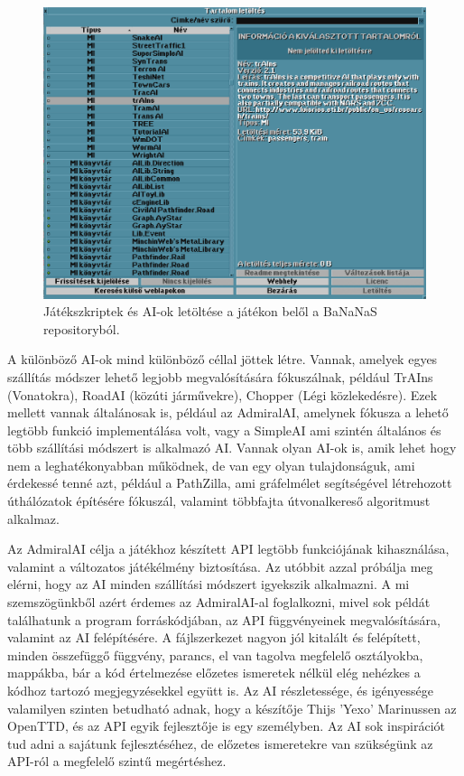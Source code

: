 \begin{figure}
	\centering
	\includegraphics[width=\textwidth]{images/bananas.png}
	\caption{Játékszkriptek és AI-ok letöltése a játékon belől a BaNaNaS repositoryból.}
	\label{fig:bananas}
\end{figure}

A különböző AI-ok mind különböző céllal jöttek létre. Vannak, amelyek egyes szállítás módszer lehető legjobb megvalósítására fókuszálnak, például TrAIns (Vonatokra), RoadAI (közúti járművekre), Chopper (Légi közlekedésre). Ezek mellett vannak általánosak is, például az AdmiralAI, amelynek fókusza a lehető legtöbb funkció implementálása volt, vagy a SimpleAI ami szintén általános és több szállítási módszert is alkalmazó AI. Vannak olyan AI-ok is, amik lehet hogy nem a leghatékonyabban működnek, de van egy olyan tulajdonságuk, ami érdekessé tenné azt, például a PathZilla, ami gráfelmélet segítségével létrehozott úthálózatok építésére fókuszál, valamint többfajta útvonalkereső algoritmust alkalmaz.

Az AdmiralAI célja a játékhoz készített API legtöbb funkciójának kihasználása, valamint a változatos játékélmény biztosítása. Az utóbbit azzal próbálja meg elérni, hogy az AI minden szállítási módszert igyekszik alkalmazni. A mi szemszögünkből azért érdemes az AdmiralAI-al foglalkozni, mivel sok példát találhatunk a program forráskódjában, az API függvényeinek megvalósítására, valamint az AI felépítésére. A fájlszerkezet nagyon jól kitalált és felépített, minden összefüggő függvény, parancs, el van tagolva megfelelő osztályokba, mappákba, bár a kód értelmezése előzetes ismeretek nélkül elég nehézkes a kódhoz tartozó megjegyzésekkel együtt is. Az AI részletessége, és igényessége valamilyen szinten betudható adnak, hogy a készítője Thijs 'Yexo' Marinussen az OpenTTD, és az API egyik fejlesztője is egy személyben. Az AI sok inspirációt tud adni a sajátunk fejlesztéséhez, de előzetes ismeretekre van szükségünk az API-ról a megfelelő szintű megértéshez.

